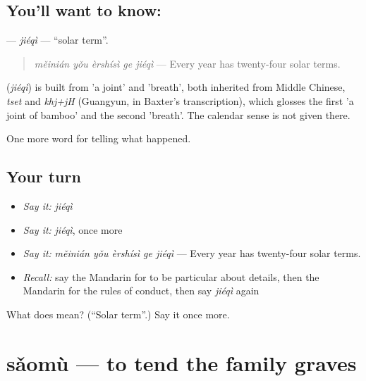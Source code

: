 \subsection*{You'll want to know: }
\textbf{} — \emph{jiéqì} — \textquotedblleft{}solar term\textquotedblright{}.

\begin{quote}
\textbf{} \emph{měinián yǒu èrshísì ge jiéqì} — Every year has twenty-four solar terms.
\end{quote}

\begin{cousinweb}
\textbf{} (\emph{jiéqì}) is built from  'a joint' and  'breath', both inherited from Middle Chinese, \emph{tset} and \emph{khj+jH} (Guangyun, in Baxter's transcription), which glosses the first 'a joint of bamboo' and the second 'breath'. The calendar sense is not given there.
\end{cousinweb}

\begin{grammarlens}[title={What you've built}]
One more word for telling what happened.
\end{grammarlens}

\subsection*{Your turn}
\begin{itemize}
\raggedright
  \item \emph{Say it:} \emph{jiéqì}
  \item \emph{Say it:} \emph{jiéqì}, once more
  \item \emph{Say it:} \emph{měinián yǒu èrshísì ge jiéqì} — Every year has twenty-four solar terms.
  \item \emph{Recall:} say the Mandarin for to be particular about details, then the Mandarin for the rules of conduct, then say \emph{jiéqì} again
\end{itemize}

\begin{tcolorbox}[breakable,colback=teal!4,colframe=teal!35!black,title={Before you move on}]
What does  mean? (\textquotedblleft{}Solar term\textquotedblright{}.) Say it once more.
\end{tcolorbox}
\section[sǎomù]{sǎomù — to tend the family graves}

